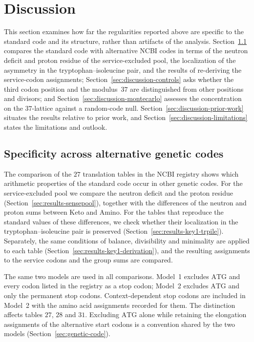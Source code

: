 \documentclass[11pt,a4paper]{article}
\renewcommand{\_}{\origunderscore\allowbreak}
\begin{document}
\section{Discussion}
\label{sec:discussion}

This section examines how far the regularities reported
above are specific to the standard code and its structure,
rather than artifacts of the analysis.
Section~\ref{sec:discussion-trpile-robustness} compares
the standard code with alternative NCBI codes in terms
of the neutron deficit and proton residue of the
service-excluded pool, the localization of the asymmetry
in the tryptophan--isoleucine pair, and the results of
re-deriving the service-codon assignments;
Section~\ref{sec:discussion-controls} asks whether the
third codon position and the modulus~$37$ are
distinguished from other positions and divisors; and
Section~\ref{sec:discussion-montecarlo} assesses the
concentration on the $37$-lattice against a random-code
null. Section~\ref{sec:discussion-prior-work} situates the
results relative to prior work, and
Section~\ref{sec:discussion-limitations} states the
limitations and outlook.

\subsection{Specificity across alternative genetic codes}
\label{sec:discussion-trpile-robustness}
\label{sec:results-key1-ncbi}

The comparison of the $27$ translation tables in the NCBI registry
shows which arithmetic properties of the standard code occur in
other genetic codes. For the service-excluded pool we compare the
neutron deficit and the proton residue
(Section~\ref{sec:results-sensepool}), together with the
differences of the neutron and proton sums between Keto and Amino.
For the tables that reproduce the standard values of these
differences, we check whether their localization in the
tryptophan--isoleucine pair is preserved
(Section~\ref{sec:results-key1-trpile}). Separately, the
same conditions of balance, divisibility and minimality are
applied to each table (Section~\ref{sec:results-key1-derivation}),
and the resulting assignments to the
service codons and the group sums are compared.

The same two models are used in all comparisons. Model~1 excludes
$\mathrm{ATG}$ and every codon listed in the registry as a stop
codon;
Model~2 excludes $\mathrm{ATG}$ and only the permanent stop
codons.
Context-dependent stop codons are included in Model~2 with the
amino acid assignments recorded for them. The distinction affects
tables $27$, $28$ and $31$. Excluding $\mathrm{ATG}$ alone while
retaining the
elongation assignments of the alternative start codons is a
convention shared by the two models
(Section~\ref{sec:genetic-code}).
\end{document}
